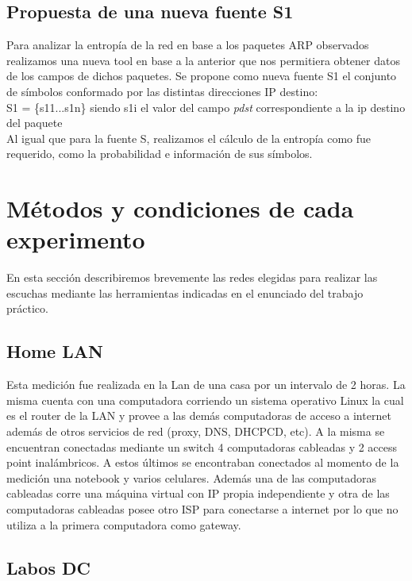 \documentclass[final,inline,narroweqnarray,a4paper]{ieee}
\begin{document}
\subsection{Propuesta de una nueva fuente S{\scriptsize 1}} \label{ssec:fuenteS1}
Para analizar la entropía de la red en base a los paquetes ARP observados realizamos una nueva tool en base a la anterior que nos permitiera obtener datos de los campos de dichos paquetes. 
	Se propone como nueva fuente S1 el conjunto de símbolos conformado por las distintas direcciones IP destino:\\
	
	
		S{\scriptsize 1} = \{s{\scriptsize 1}{\tiny 1}...s{\scriptsize 1}{\tiny n}\} siendo s{\scriptsize 1}{\tiny i} el valor del campo \textit{pdst} correspondiente a la ip destino del paquete\\
		
	
	Al igual que para la fuente S, realizamos el cálculo de la entropía como fue requerido, como la probabilidad e información de sus símbolos.  

\section{Métodos y condiciones de cada experimento}

En esta sección describiremos brevemente las redes elegidas para realizar las escuchas mediante las herramientas indicadas en el enunciado del trabajo práctico.

\subsection{Home LAN}

Esta medición fue realizada en la Lan de una casa por un intervalo de 2 horas. La misma cuenta con una computadora corriendo un sistema operativo Linux la cual es el router de la LAN y provee a las demás computadoras de acceso a internet además de otros servicios de red (proxy, DNS, DHCPCD, etc). A la misma se encuentran conectadas mediante un switch 4 computadoras cableadas y 2 access point inalámbricos. A estos últimos se encontraban conectados al momento de la medición una notebook y varios celulares. Además una de las computadoras cableadas corre una máquina virtual con IP propia independiente y otra de las computadoras cableadas posee otro ISP para conectarse a internet por lo que no utiliza a la primera computadora como gateway.

\subsection{Labos DC}
\end{document}
